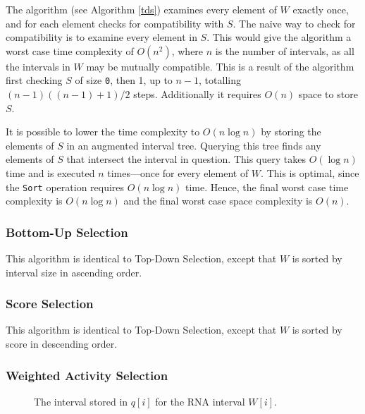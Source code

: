\documentclass{cshonours}
\begin{document}
	
The algorithm (see Algorithm \ref{tds}) examines every element of $W$ exactly once, and for each element checks for compatibility with $S$. The naive way to check for compatibility is to examine every element in $S$. This would give the algorithm a worst case time complexity of $O(n^2)$, where $n$ is the number of intervals, as all the intervals in $W$ may be mutually compatible. This is a result of the algorithm first checking $S$ of size \texttt{0}, then 1, up to $n-1$, totalling $(n-1)((n-1)+1) / 2$ steps. Additionally it requires $O(n)$ space to store $S$.

It is possible to lower the time complexity to $O(n \log n)$ by storing the elements of $S$ in an augmented interval tree. Querying this tree finds any elements of $S$ that intersect the interval in question. This query takes $O(\log n)$ time and is executed $n$ times---once for every element of $W$. This is optimal, since the \texttt{Sort} operation requires $O(n \log n)$ time. Hence, the final worst case time complexity is $O(n \log n)$ and the final worst case space complexity is $O(n)$.


\subsubsection{Bottom-Up Selection}
This algorithm is identical to Top-Down Selection, except that $W$ is sorted by interval size in ascending order.

\subsubsection{Score Selection}
This algorithm is identical to Top-Down Selection, except that $W$ is sorted by score in descending order.


\subsubsection{Weighted Activity Selection}

\begin{figure}
\begin{center}
\end{center}
\caption{The interval stored in $q[i]$ for the RNA interval $W[i]$.}
\label{fig:rightcompat}
\end{figure}
\end{document}
